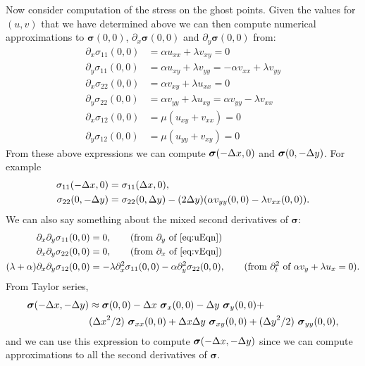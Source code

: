 \documentclass[11pt]{article}
\newcommand{\sigmav}{\boldsymbol{\sigma}}
\begin{document}
Now consider computation of the stress on the ghost points.
Given the values for $(u,v)$ that we have determined above 
we can then compute numerical approximations to $\sigmav(0,0)$, $\partial_x \sigmav(0,0)$ and $\partial_y\sigmav(0,0)$ from:
\begin{align}
 \partial_x \sigma_{11}(0,0) &=  \alpha u_{xx} +\lambda v_{xy} = 0 \\
 \partial_y \sigma_{11}(0,0) &=  \alpha u_{xy} +\lambda v_{yy} = -\alpha v_{xx} +\lambda v_{yy}  \\
 \partial_x \sigma_{22}(0,0) &=  \alpha v_{xy} +\lambda u_{xx} = 0 \\
 \partial_y \sigma_{22}(0,0) &=  \alpha v_{yy} +\lambda u_{xy} =\alpha v_{yy} -\lambda v_{xx}  \\
 \partial_x \sigma_{12}(0,0) &=  \mu( u_{xy} + v_{xx} ) = 0 \\
 \partial_y \sigma_{12}(0,0) &=  \mu( u_{yy} + v_{xy} ) = 0 
\end{align} 
From these above expressions we can compute $\sigmav(-\dx,0)$ and $\sigmav(0,-\dy)$. For example
\begin{align}
  \sigma_{11}(-{\Delta x},0) &= \sigma_{11}({\Delta x},0) , \\
   \sigma_{22}(0,-{\Delta y}) &= \sigma_{22}(0,{\Delta y}) - (2{\Delta y})( \alpha v_{yy}(0,0) -\lambda v_{xx} (0,0)) . 
\end{align} 
We can also say something about the mixed second derivatives of $\sigmav$:
\begin{align}
  \partial_x \partial_y \sigma_{11}(0,0) &= 0 , \qquad\text{(from $\partial_y$ of \eqref{eq:uEqn})} \\
  \partial_x \partial_y \sigma_{22}(0,0) &= 0 , \qquad\text{(from $\partial_x$ of \eqref{eq:vEqn})} \\
  (\lambda+\alpha) \partial_x \partial_y \sigma_{12}(0,0) &= -\lambda\partial_x^2\sigma_{11}(0,0)
                              - \alpha \partial_y^2 \sigma_{22}(0,0) , 
              \qquad\text{(from $\partial_t^2$ of $\alpha v_y +\lambda u_x=0$)} .
\end{align} 
From Taylor series, 
\begin{align}
  \sigmav(-\dx,-\dy) & \approx \sigmav(0,0) -\dx~\sigmav_x(0,0) -\dy~ \sigmav_y(0,0) + \\
               & (\dx^2/2)~ \sigmav_{xx}(0,0) + \dx\dy~ \sigmav_{xy}(0,0) + (\dy^2/2)~ \sigmav_{yy}(0,0) ,
\end{align}
and we can use this expression to compute $\sigmav(-\dx,-\dy)$ since we can compute approximations
to all the second derivatives of $\sigmav$. 
\end{document}
